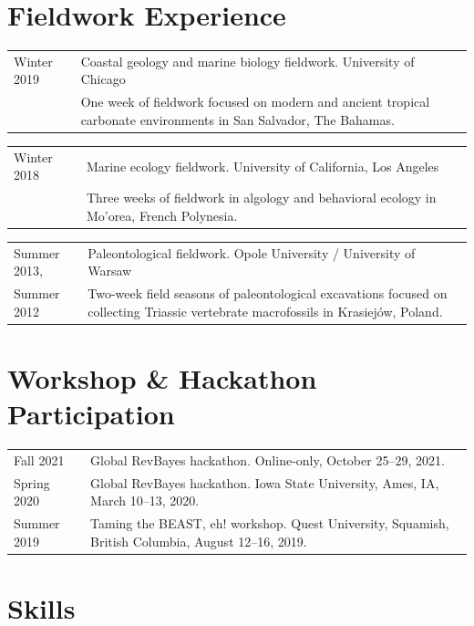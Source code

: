 \documentclass[10pt]{article}
\begin{document}
\section*{Fieldwork Experience}

\begin{tabularx}{\textwidth}{>{\raggedleft\arraybackslash}p{2.2cm} X}
Winter 2019 & Coastal geology and marine biology fieldwork. University of Chicago \\
& One week of fieldwork focused on modern and ancient tropical carbonate environments in San Salvador, The Bahamas.
\end{tabularx}
\begin{tabularx}{\textwidth}{>{\raggedleft\arraybackslash}p{2.2cm} X}
Winter 2018 & Marine ecology fieldwork. University of California, Los Angeles \\
& Three weeks of fieldwork in algology and behavioral ecology in Mo'orea, French Polynesia.
\end{tabularx}
\begin{tabularx}{\textwidth}{>{\raggedleft\arraybackslash}p{2.2cm} X}
Summer 2013, & Paleontological fieldwork. Opole University / University of Warsaw \\
Summer 2012 & Two-week field seasons of paleontological excavations focused on collecting Triassic vertebrate macrofossils in Krasiej\'{o}w, Poland.
\end{tabularx}

\section*{Workshop \& Hackathon Participation}

\begin{tabularx}{\textwidth}{>{\raggedleft\arraybackslash}p{2.2cm} X}
Fall 2021 & Global \textsf{RevBayes} hackathon. Online-only, October 25--29, 2021. \\[0.1cm]
Spring 2020 & Global \textsf{RevBayes} hackathon. Iowa State University, Ames, IA, March 10--13, 2020. \\[0.1cm]
Summer 2019 & Taming the BEAST, eh! workshop. Quest University, Squamish, British Columbia, August 12--16, 2019.
\end{tabularx}

\section*{Skills}
\end{document}
